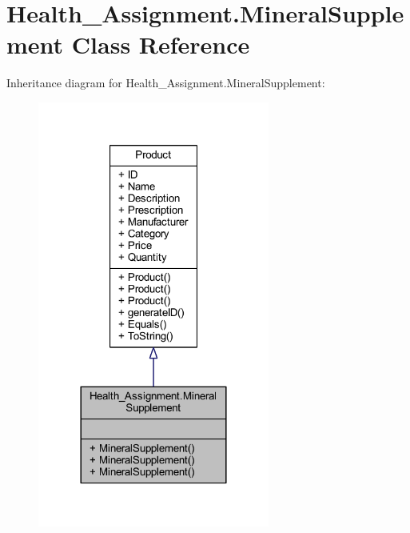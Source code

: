 \hypertarget{class_health___assignment_1_1_mineral_supplement}{}\section{Health\+\_\+\+Assignment.\+Mineral\+Supplement Class Reference}
\label{class_health___assignment_1_1_mineral_supplement}


Inheritance diagram for Health\+\_\+\+Assignment.\+Mineral\+Supplement\+:\nopagebreak
\begin{figure}[H]
\begin{center}
\leavevmode
\includegraphics[width=216pt]{class_health___assignment_1_1_mineral_supplement__inherit__graph}
\end{center}
\end{figure}


